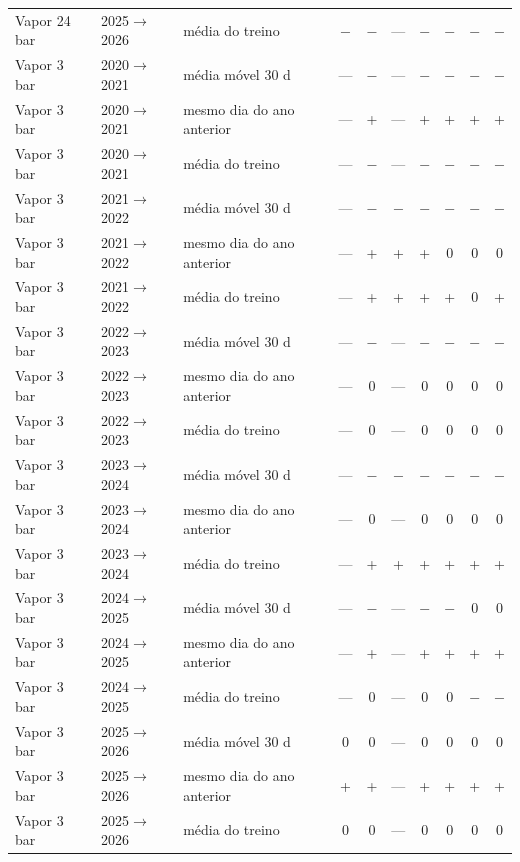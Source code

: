 {\begin{xltabular}{\linewidth}{@{}llp{2.6cm}ccccccc@{}}
Vapor 24 bar & 2025$\to$2026 & média do treino & $-$ & $-$ & --- & $-$ & $-$ & $-$ & $-$ \\
Vapor 3 bar & 2020$\to$2021 & média móvel 30 d & --- & $-$ & --- & $-$ & $-$ & $-$ & $-$ \\
Vapor 3 bar & 2020$\to$2021 & mesmo dia do ano anterior & --- & + & --- & + & + & + & + \\
Vapor 3 bar & 2020$\to$2021 & média do treino & --- & $-$ & --- & $-$ & $-$ & $-$ & $-$ \\
Vapor 3 bar & 2021$\to$2022 & média móvel 30 d & --- & $-$ & $-$ & $-$ & $-$ & $-$ & $-$ \\
Vapor 3 bar & 2021$\to$2022 & mesmo dia do ano anterior & --- & + & + & + & 0 & 0 & 0 \\
Vapor 3 bar & 2021$\to$2022 & média do treino & --- & + & + & + & + & 0 & + \\
Vapor 3 bar & 2022$\to$2023 & média móvel 30 d & --- & $-$ & --- & $-$ & $-$ & $-$ & $-$ \\
Vapor 3 bar & 2022$\to$2023 & mesmo dia do ano anterior & --- & 0 & --- & 0 & 0 & 0 & 0 \\
Vapor 3 bar & 2022$\to$2023 & média do treino & --- & 0 & --- & 0 & 0 & 0 & 0 \\
Vapor 3 bar & 2023$\to$2024 & média móvel 30 d & --- & $-$ & $-$ & $-$ & $-$ & $-$ & $-$ \\
Vapor 3 bar & 2023$\to$2024 & mesmo dia do ano anterior & --- & 0 & --- & 0 & 0 & 0 & 0 \\
Vapor 3 bar & 2023$\to$2024 & média do treino & --- & + & + & + & + & + & + \\
Vapor 3 bar & 2024$\to$2025 & média móvel 30 d & --- & $-$ & --- & $-$ & $-$ & 0 & 0 \\
Vapor 3 bar & 2024$\to$2025 & mesmo dia do ano anterior & --- & + & --- & + & + & + & + \\
Vapor 3 bar & 2024$\to$2025 & média do treino & --- & 0 & --- & 0 & 0 & $-$ & $-$ \\
Vapor 3 bar & 2025$\to$2026 & média móvel 30 d & 0 & 0 & --- & 0 & 0 & 0 & 0 \\
Vapor 3 bar & 2025$\to$2026 & mesmo dia do ano anterior & + & + & --- & + & + & + & + \\
Vapor 3 bar & 2025$\to$2026 & média do treino & 0 & 0 & --- & 0 & 0 & 0 & 0 \\
\end{xltabular}
}
